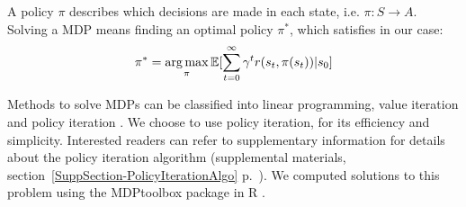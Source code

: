 A policy $\pi$ describes which decisions are made in each state, i.e. $ \pi : S \rightarrow A$. Solving a MDP means finding an optimal policy $\pi^*$, which satisfies in our case:
\begin{equation}
\pi^* = \operatorname*{arg\,max}_\pi \mathbb{E}[\sum\limits_{t=0}^\infty \gamma^t r(s_t,\pi(s_t))|s_0]
\end{equation}

Methods to solve MDPs can be classified into linear programming, value iteration and policy iteration \citep{sigaud_markov_2010}. We choose to use policy iteration, for its efficiency \citep{sigaud_markov_2010} and simplicity. Interested readers can refer to supplementary information for details about the policy iteration algorithm (supplemental materials, section~\ref{SuppSection-PolicyIterationAlgo} p.~\pageref{SuppSection-PolicyIterationAlgo}). We computed solutions to this problem using the MDPtoolbox package in R \citep{MDPtoolbox}.



